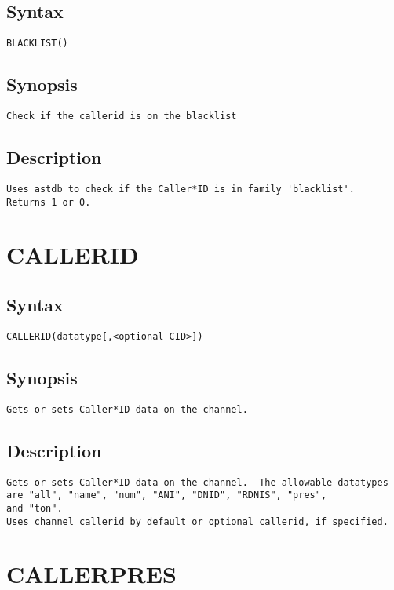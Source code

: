 \subsection{Syntax}
\begin{verbatim}
BLACKLIST()
\end{verbatim}
\subsection{Synopsis}
\begin{verbatim}
Check if the callerid is on the blacklist
\end{verbatim}
\subsection{Description}
\begin{verbatim}
Uses astdb to check if the Caller*ID is in family 'blacklist'.  Returns 1 or 0.

\end{verbatim}


\section{CALLERID}
\subsection{Syntax}
\begin{verbatim}
CALLERID(datatype[,<optional-CID>])
\end{verbatim}
\subsection{Synopsis}
\begin{verbatim}
Gets or sets Caller*ID data on the channel.
\end{verbatim}
\subsection{Description}
\begin{verbatim}
Gets or sets Caller*ID data on the channel.  The allowable datatypes
are "all", "name", "num", "ANI", "DNID", "RDNIS", "pres",
and "ton".
Uses channel callerid by default or optional callerid, if specified.

\end{verbatim}


\section{CALLERPRES}
